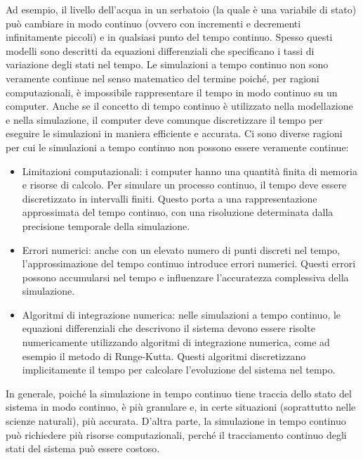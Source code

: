 \documentclass[12pt,a4paper,openright,twoside]{book}
\begin{document}
Ad esempio, il livello dell'acqua in un serbatoio (la quale è una variabile di stato) può cambiare in modo continuo (ovvero con incrementi e decrementi infinitamente piccoli) e in qualsiasi punto del tempo continuo. Spesso questi modelli sono descritti da equazioni differenziali che specificano i tassi di variazione degli stati nel tempo.
Le simulazioni a tempo continuo non sono veramente continue nel senso matematico del termine poiché, per ragioni computazionali, è impossibile rappresentare il tempo in modo continuo su un computer. Anche se il concetto di tempo continuo è utilizzato nella modellazione e nella simulazione, il computer deve comunque discretizzare il tempo per eseguire le simulazioni in maniera efficiente e accurata.
Ci sono diverse ragioni per cui le simulazioni a tempo continuo non possono essere veramente continue:
\begin{itemize}
    \item Limitazioni computazionali: i computer hanno una quantità finita di memoria e risorse di calcolo. Per simulare un processo continuo, il tempo deve essere discretizzato in intervalli finiti. Questo porta a una rappresentazione approssimata del tempo continuo, con una risoluzione determinata dalla precisione temporale della simulazione. 
    \item Errori numerici: anche con un elevato numero di punti discreti nel tempo, l'approssimazione del tempo continuo introduce errori numerici. Questi errori possono accumularsi nel tempo e influenzare l'accuratezza complessiva della simulazione.
    \item Algoritmi di integrazione numerica: nelle simulazioni a tempo continuo, le equazioni differenziali che descrivono il sistema devono essere risolte numericamente utilizzando algoritmi di integrazione numerica, come ad esempio il metodo di Runge-Kutta. Questi algoritmi discretizzano implicitamente il tempo per calcolare l'evoluzione del sistema nel tempo.
\end{itemize}

In generale, poiché la simulazione in tempo continuo tiene traccia dello stato del sistema in modo continuo, è più granulare e, in certe situazioni (soprattutto nelle scienze naturali), più accurata. D'altra parte, la simulazione in tempo continuo può richiedere più risorse computazionali, perché il tracciamento continuo degli stati del sistema può essere costoso.
\end{document}
